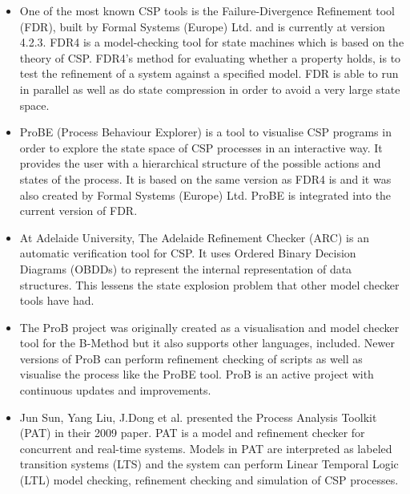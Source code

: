 \begin{itemize}
\item One of the most known CSP tools is the Failure-Divergence Refinement tool (FDR), built by Formal Systems (Europe) Ltd. and is currently at version 4.2.3\cite{fdr}. FDR4 is a model-checking tool for state machines which is based on the theory of CSP. FDR4's method for evaluating whether a property holds, is to test the refinement of a system against a specified model.
FDR is able to run in parallel as well as do state compression in order to avoid a very large state space.
\item ProBE (Process Behaviour Explorer)\cite{probe} is a tool to visualise CSP programs in order to explore the state space of CSP processes in an interactive way. It provides the user with a hierarchical structure of the possible actions and states of the process. It is based on the same \cspm{} version as FDR4 is and it was also created by Formal Systems (Europe) Ltd. ProBE is integrated into the current version of FDR.
\item At Adelaide University, The Adelaide Refinement Checker (ARC)\cite{Parashkevov1996} is an automatic verification tool for CSP. It uses Ordered Binary Decision Diagrams (OBDDs) to represent the internal representation of data structures. This lessens the state explosion problem that other model checker tools have had.
\item The ProB project\cite{ProB}\cite{Leuschel2003} was originally created as a visualisation and model checker tool for the B-Method\cite{Abrial1988} but it also supports other languages, \cspm{} included. Newer versions of ProB can perform refinement checking of \cspm{} scripts as well as visualise the process like the ProBE tool. ProB is an active project with continuous updates and improvements.
\item Jun Sun, Yang Liu, J.Dong et al. presented the Process Analysis Toolkit (PAT) in their 2009 paper\cite{Sun2009}. PAT is a model and refinement checker for concurrent and real-time systems. Models in PAT are interpreted as labeled transition systems (LTS) and the system can perform Linear Temporal Logic (LTL) model checking, refinement checking and simulation of CSP processes.
\end{itemize}

